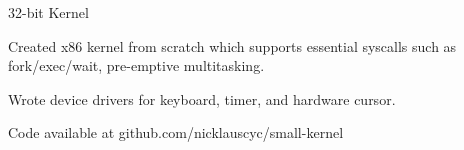 
\vspace{-3.5mm}

\begin{cventries}

    \begin{multicols}{2}
  \cventry
    {} %
    {32-bit Kernel} %
    {} %
    {} %
    {
      \begin{cvitems} %
        \item {Created x86 kernel from scratch which supports essential syscalls
          \newline such as fork/exec/wait, pre-emptive multitasking.
        \item Wrote device drivers for keyboard, timer, and hardware cursor.}
        \item {Code available at github.com/nicklauscyc/small-kernel}
      \end{cvitems}
    }




\end{multicols}
\end{cventries}

